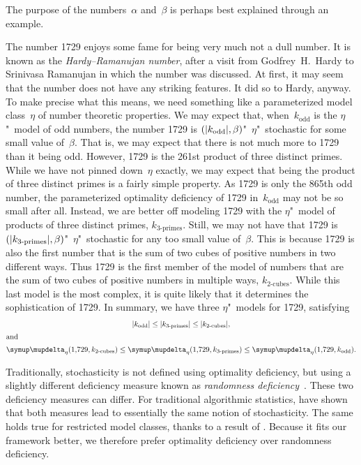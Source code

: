 The purpose of the numbers~$\alpha$ and~$\beta$ is perhaps best explained through an example.
\begin{example}
  The number \num{1729} enjoys some fame for being very much not a dull number.
  It is known as the \emph{Hardy--Ramanujan number}, after a visit from Godfrey~H.~Hardy to Srinivasa Ramanujan in which the number was discussed.
  At first, it may seem that the number does not have any striking features.
  It did so to Hardy, anyway.
  To make precise what this means, we need something like a parameterized model class~$\eta$ of number theoretic properties.
  We may expect that, when~$k_\text{odd}$ is the $\eta$"~model of odd numbers, the number \num{1729} is $({\lvert k_\text{odd}\rvert}, \beta)$"~$\eta$"~stochastic for some small value of~$\beta$.
  That is, we may expect that there is not much more to \num{1729} than it being odd.
  However, \num{1729} is the \num{261}st product of three distinct primes.
  While we have not pinned down~$\eta$ exactly, we may expect that being the product of three distinct primes is a fairly simple property.
  As \num{1729} is only the \num{865}th odd number, the parameterized optimality deficiency of \num{1729} in~$k_\text{odd}$ may not be so small after all.
  Instead, we are better off modeling \num{1729} with the $\eta$"~model of products of three distinct primes, $k_{3\text{-primes}}$.
  Still, we may not have that \num{1729} is $({\lvert k_{3\text{-primes}}\rvert}, \beta)$"~$\eta$"~stochastic for any too small value of~$\beta$.
  This is because \num{1729} is also the first number that is the sum of two cubes of positive numbers in two different ways.
  Thus \num{1729} is the first member of the model of numbers that are the sum of two cubes of positive numbers in multiple ways, $k_{2\text{-cubes}}$.
  While this last model is the most complex, it is quite likely that it determines the sophistication of \num{1729}.
  In summary, we have three $\eta$"~models for \num{1729}, satisfying
  \begin{gather*}
    \length{k_\text{odd}} \le \length{k_{3\text{-primes}}} \le \length{k_{2\text{-cubes}}}, \\
  \shortintertext{and}
    \updelta_\eta(\num{1729}, k_{2\text{-cubes}}) \le \updelta_\eta(\num{1729}, k_{3\text{-primes}}) \le \updelta_\eta(\num{1729}, k_\text{odd}).
  \end{gather*}
\end{example}

Traditionally, stochasticity is not defined using optimality deficiency, but using a slightly different deficiency measure known as \emph{randomness deficiency}~\parencite{shen1983concept,li2008introduction}.
These two deficiency measures can differ.
For traditional algorithmic statistics, \textcite[Theorem~2]{vereshchagin2017algorithmic} have shown that both measures lead to essentially the same notion of stochasticity.
The same holds true for restricted model classes, thanks to a result of \textcite{vereshchagin2010rate} \parencite[see also][]{vereshchagin2017algorithmic}.
Because it fits our framework better, we therefore prefer optimality deficiency over randomness deficiency.

